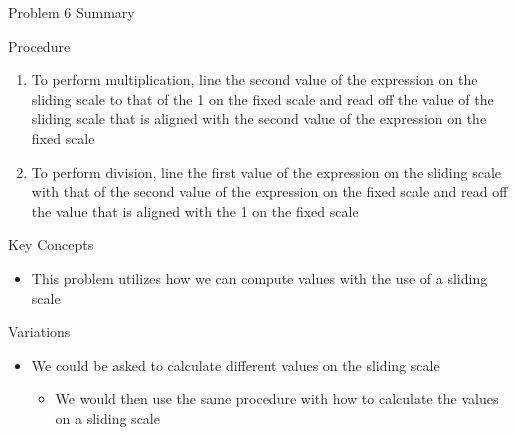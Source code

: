 \begin{summary}{Problem 6 Summary}
    \begin{statement}{Procedure}
        \begin{enumerate}[label = (\alph*)]
            \item To perform multiplication, line the second value of the expression on the sliding scale to that of the 1 on the fixed scale and read off the value of the sliding scale that is aligned with the second value
            of the expression on the fixed scale
            \item To perform division, line the first value of the expression on the sliding scale with that of the second value of the expression on the fixed scale and read off the value that is aligned with the 1 on the fixed
            scale
        \end{enumerate}
    \end{statement}
    \begin{statement}{Key Concepts}
        \begin{itemize}
            \item This problem utilizes how we can compute values with the use of a sliding scale
        \end{itemize}
    \end{statement}
    \begin{statement}{Variations}
        \begin{itemize}
            \item We could be asked to calculate different values on the sliding scale
            \begin{itemize}
                \item We would then use the same procedure with how to calculate the values on a sliding scale
            \end{itemize}
        \end{itemize}
    \end{statement}
\end{summary}

